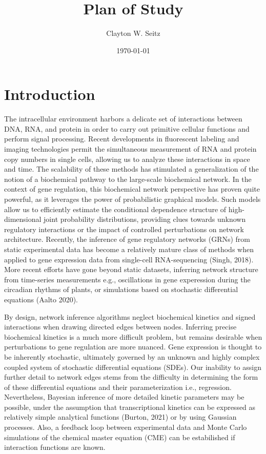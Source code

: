 \documentclass{article}
\title{Plan of Study}
\author{Clayton W. Seitz}
\date{\today}
\begin{document}
  \maketitle%
\vspace{0.4in}

\begin{abstract}
\end{abstract}

\section{Introduction}

The intracellular environment harbors a delicate set of interactions between DNA, RNA, and protein in order to carry out primitive cellular functions and perform signal processing. Recent developments in fluorescent labeling and imaging technologies permit the simultaneous measurement of RNA and protein copy numbers in single cells, allowing us to analyze these interactions in space and time. The scalability of these methods has stimulated a generalization of the notion of a biochemical pathway to the large-scale biochemical network. In the context of gene regulation, this biochemical network perspective has proven quite powerful, as it leverages the power of probabilistic graphical models. Such models allow us to efficiently estimate the conditional dependence structure of high-dimensional joint probability distributions, providing clues towards unknown regulatory interactions or the impact of controlled perturbations on network architecture. Recently, the inference of gene regulatory networks (GRNs) from static experimental data has become a relatively mature class of methods when applied to gene expression data from single-cell RNA-sequencing (Singh, 2018). More recent efforts have gone beyond static datasets, inferring network structure from time-series measurements e.g., oscillations in gene experession during the circadian rhythms of plants, or simulations based on stochastic differential equations (Aalto 2020). 

By design, network inference algorithms neglect biochemical kinetics and signed interactions when drawing directed edges between nodes. Inferring precise biochemical kinetics is a much more difficult problem, but remains desirable when perturbations to gene regulation are more nuanced. Gene expression is thought to be inherently stochastic, ultimately governed by an unknown and highly complex coupled system of stochastic differential equations (SDEs). Our inability to assign further detail to network edges stems from the difficulty in determining the form of these differential equations and their parameterization i.e., regression. Nevertheless, Bayesian inference of more detailed kinetic parameters may be possible, under the assumption that transcriptional kinetics can be expressed as relatively simple analytical functions (Burton, 2021) or by using Gaussian processes. Also, a feedback loop between experimental data and Monte Carlo simulations of the chemical master equation (CME) can be estabilished if interaction functions are known.
\end{document}
